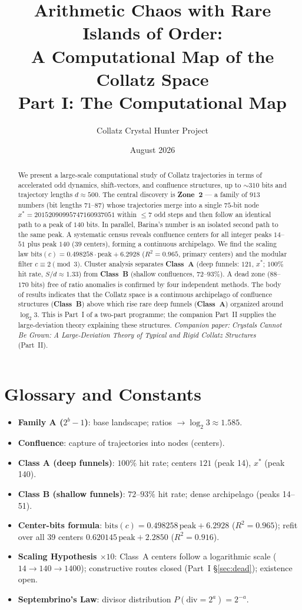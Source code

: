\documentclass[12pt,a4paper]{article}
\title{Arithmetic Chaos with Rare Islands of Order:\\
A Computational Map of the Collatz Space\\
\large Part I: The Computational Map}
\author{Collatz Crystal Hunter Project}
\date{August 2026}
\theoremstyle{remark}
\begin{document}
\maketitle
\begin{abstract}
We present a large-scale computational study of Collatz trajectories in terms of
accelerated odd dynamics, shift-vectors, and confluence structures, up to
$\sim310$ bits and trajectory lengths $d\approx500$. The central discovery is
\textbf{Zone~2} --- a family of $913$ numbers (bit lengths $71$--$87$) whose
trajectories merge into a single $75$-bit node
$x^*=20152090995747160937051$ within $\le7$ odd steps and then follow an
identical path to a peak of $140$ bits. In parallel, Barina's number is an
isolated second path to the same peak. A systematic census reveals confluence
centers for all integer peaks $14$--$51$ plus peak $140$ ($39$ centers),
forming a continuous archipelago. We find the scaling law
$\mathrm{bits}(c)=0.498258\cdot\mathrm{peak}+6.2928$ ($R^2=0.965$, primary
centers) and the modular filter $c\equiv2\pmod3$. Cluster analysis separates
\textbf{Class~A} (deep funnels: $121$, $x^*$; $100\%$ hit rate,
$S/d\approx1.33$) from \textbf{Class~B} (shallow confluences, $72$--$93\%$).
A dead zone ($88$--$170$ bits) free of ratio anomalies is confirmed by four
independent methods. The body of results indicates that the Collatz space is a
continuous archipelago of confluence structures (\textbf{Class~B}) above which
rise rare deep funnels (\textbf{Class~A}) organized around $\log_2 3$.
This is Part~I of a two-part programme; the companion Part~II supplies the
large-deviation theory explaining these structures.
\smallskip
\noindent\textit{Companion paper:} \textit{Crystals Cannot Be Grown: A
Large-Deviation Theory of Typical and Rigid Collatz Structures} (Part~II).
\end{abstract}

\section*{Glossary and Constants}
\begin{itemize}
\item \textbf{Family A ($2^b-1$)}: base landscape; ratios $\to\log_2 3\approx1.585$.
\item \textbf{Confluence}: capture of trajectories into nodes (centers).
\item \textbf{Class A (deep funnels)}: $100\%$ hit rate; centers $121$ (peak 14), $x^*$ (peak 140).
\item \textbf{Class B (shallow funnels)}: $72$--$93\%$ hit rate; dense archipelago (peaks 14--51).
\item \textbf{Center-bits formula}: $\mathrm{bits}(c)=0.498258\,\mathrm{peak}+6.2928$ ($R^2=0.965$); refit over all 39 centers $0.620145\,\mathrm{peak}+2.2850$ ($R^2=0.916$).
\item \textbf{Scaling Hypothesis $\times10$}: Class~A centers follow a logarithmic scale ($14\to140\to1400$); constructive routes closed (Part~I \S\ref{sec:dead}); existence open.
\item \textbf{Septembrino's Law}: divisor distribution $P(\mathrm{div}=2^a)=2^{-a}$.
\end{itemize}
\end{document}

